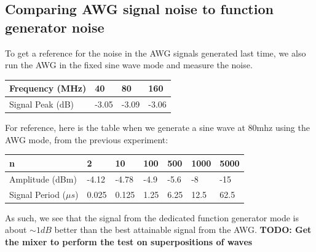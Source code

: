 \documentclass{article}
\begin{document}
    \subsection*{Comparing AWG signal noise to function generator noise}
    To get a reference for the noise in the AWG signals generated last time, we also run the AWG in the fixed sine wave mode and measure the noise.
    \begin{table}[H]
    \centering
    \begin{tabular}{|l|l|l|l|}
    \hline
    Frequency (MHz) & 40 & 80 & 160 \\ \hline
    Signal Peak (dB) & -3.05 & -3.09 & -3.06 \\ \hline
    \end{tabular}
    \end{table}
    For reference, here is the table when we generate a sine wave at 80mhz using the AWG mode, from the previous experiment:
    \begin{table}[H]
    \centering
    \begin{tabular}{|l|l|l|l|l|l|l|}
    \hline
    n & 2 & 10 & 100 & 500 & 1000 & 5000 \\ \hline
    Amplitude (dBm) & -4.12 & -4.78 & -4.9 & -5.6 & -8 & -15 \\ \hline
    Signal Period ($\mu s$) & 0.025 & 0.125 & 1.25 & 6.25 & 12.5 & 62.5 \\ \hline
    \end{tabular}
    \end{table}
    As such, we see that the signal from the dedicated function generator mode is about $\sim 1dB$ better than the best attainable signal from the AWG. \textbf{TODO: Get the mixer to perform the test on superpositions of waves}
\end{document}
